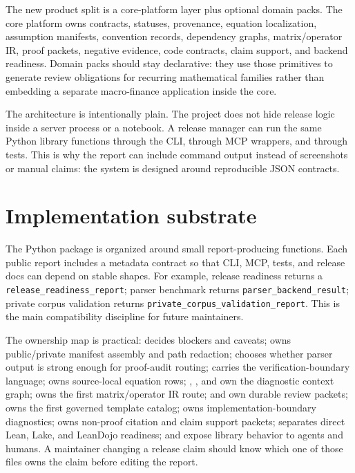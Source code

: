\documentclass[12pt,a4paper,openany]{book}
\begin{document}
The new product split is a core-platform layer plus optional domain packs. The
core platform owns contracts, statuses, provenance, equation localization,
assumption manifests, convention records, dependency graphs, matrix/operator
IR, proof packets, negative evidence, code contracts, claim support, and backend
readiness. Domain packs should stay declarative: they use those primitives to
generate review obligations for recurring mathematical families rather than
embedding a separate macro-finance application inside the core.

The architecture is intentionally plain. The project does not hide release logic
inside a server process or a notebook. A release manager can run the same Python
library functions through the CLI, through MCP wrappers, and through tests. This
is why the report can include command output instead of screenshots or manual
claims: the system is designed around reproducible JSON contracts.

\section{Implementation substrate}

The Python package is organized around small report-producing functions. Each
public report includes a metadata contract so that CLI, MCP, tests, and release
docs can depend on stable shapes. For example, release readiness returns a
\texttt{release\_readiness\_report}; parser benchmark returns
\texttt{parser\_backend\_result}; private corpus validation returns
\texttt{private\_corpus\_validation\_report}. This is the main compatibility
discipline for future maintainers.

The ownership map is practical:
 decides blockers and caveats;
 owns public/private manifest assembly and path
redaction;  chooses whether parser output is strong
enough for proof-audit routing;  carries the
verification-boundary language;  owns source-local
equation rows; , , and
 own the diagnostic context graph;
 owns the first matrix/operator IR route;
 and  own durable review
packets;  owns the first governed template catalog;
 owns implementation-boundary diagnostics;
 owns non-proof citation and claim support packets;
 separates direct Lean, Lake, and LeanDojo readiness;
 and  expose library behavior to agents and
humans. A maintainer changing a release claim should know which one of those
files owns the claim before editing the report.
\end{document}
